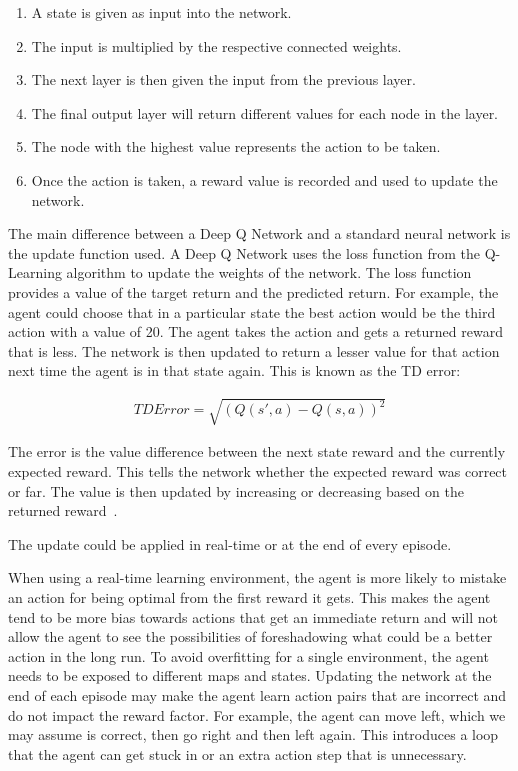 \begin{enumerate}
    \item A state is given as input into the network.
    \item The input is multiplied by the respective connected weights.
    \item The next layer is then given the input from the previous layer.
    \item The final output layer will return different values for each node in
        the layer.
    \item The node with the highest value represents the action to be taken.
    \item Once the action is taken, a reward value is recorded and used to
        update the network.
\end{enumerate}

The main difference between a Deep Q Network and a standard neural network is the
update function used. A Deep Q Network uses the loss function from the
Q-Learning algorithm to update the weights of the network. The loss function
provides a value of the target return and the predicted return. For example, the
agent could choose that in a particular state the best action would be the third
action with a value of 20. The agent takes the action and gets a returned reward
that is less. The network is then updated to return a lesser value for that
action next time the agent is in that state again. This is known as the TD
error:

\begin{align}
    TD Error = \sqrt{{(Q(s',a) - Q(s,a))}^{2}}
\end{align}

The error is the value difference between the next state reward and the
currently expected reward. This tells the network whether the expected reward
was correct or far. The value is then updated by increasing or decreasing based
on the returned reward~\cite{pandey2010reinforcement}.

The update could be applied in real-time or at the end of every episode.

When using a real-time learning environment, the agent is more likely to mistake
an action for being optimal from the first reward it gets. This makes the agent
tend to be more bias towards actions that get an immediate return and will not
allow the agent to see the possibilities of foreshadowing what could be a better
action in the long run. To avoid overfitting for a single environment, the
agent needs to be exposed to different maps and states. Updating the network at
the end of each episode may make the agent learn action pairs that are
incorrect and do not impact the reward factor. For example, the agent can move
left, which we may assume is correct, then go right and then left again. This
introduces a loop that the agent can get stuck in or an extra action step that
is unnecessary.


